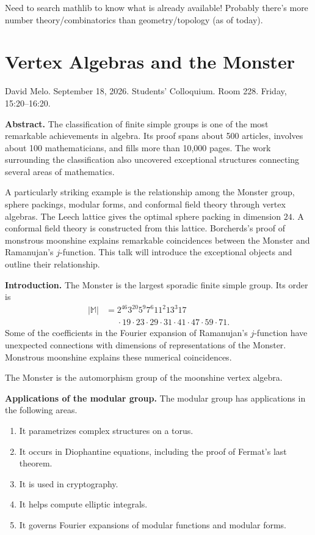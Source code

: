 Need to search mathlib to know what is already
available! Probably there's more
number theory/combinatorics than
geometry/topology (as of today).

\section{Vertex Algebras and the Monster}
\label{section-vertex-algebras-monster}

\noindent
David Melo. September 18, 2026.
Students' Colloquium. Room 228.
Friday, 15:20--16:20.

\medskip\noindent
{\bf Abstract.}
The classification of finite simple groups is
one of the most remarkable achievements in
algebra. Its proof spans about 500 articles,
involves about 100 mathematicians, and fills
more than 10,000 pages. The work surrounding
the classification also uncovered exceptional
structures connecting several areas of
mathematics.

A particularly striking example is the
relationship among the Monster group, sphere
packings, modular forms, and conformal field
theory through vertex algebras. The Leech
lattice gives the optimal sphere packing in
dimension $24$. A conformal field theory is
constructed from this lattice. Borcherds's
proof of monstrous moonshine explains
remarkable coincidences between the
Monster and Ramanujan's $j$-function. This
talk will introduce the exceptional objects
and outline their relationship.

\medskip\noindent
{\bf Introduction.}
The Monster is the largest sporadic finite
simple group. Its order is
$$
\begin{aligned}
|\mathbb{M}|
&=2^{46}3^{20}5^9 7^6 11^2 13^3 17\\
&\phantom{={}}\cdot19\cdot23\cdot29\cdot31
\cdot41\cdot47\cdot59\cdot71.
\end{aligned}
$$
Some of the coefficients in the Fourier
expansion of Ramanujan's $j$-function have
unexpected connections with dimensions of
representations of the Monster. Monstrous
moonshine explains these numerical
coincidences.

The Monster is the automorphism group of the
moonshine vertex algebra.

\medskip\noindent
{\bf Applications of the modular group.}
The modular group has applications in the
following areas.

\begin{enumerate}
\item
It parametrizes complex structures on a
torus.

\item
It occurs in Diophantine equations, including
the proof of Fermat's last theorem.

\item
It is used in cryptography.

\item
It helps compute elliptic integrals.

\item
It governs Fourier expansions of modular
functions and modular forms.
\end{enumerate}

